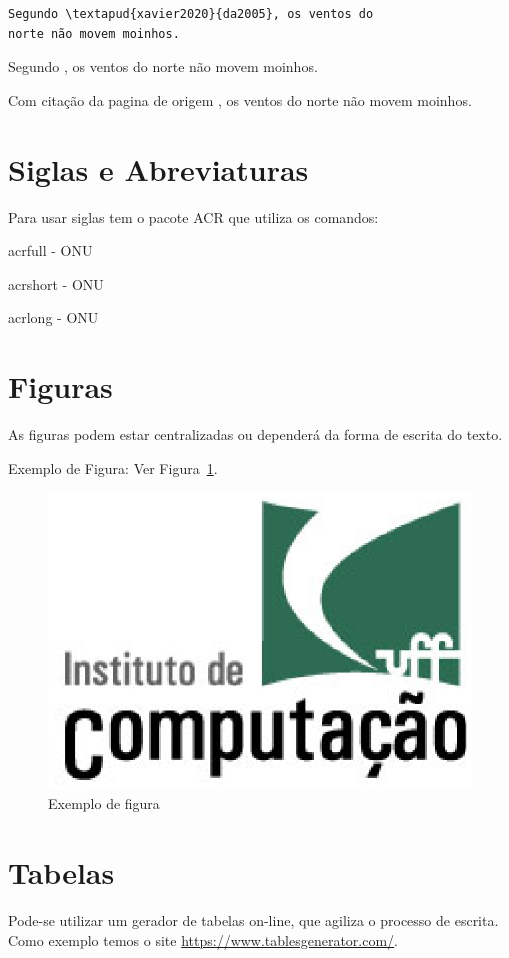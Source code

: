  \begin{verbatim}
Segundo \textapud{xavier2020}{da2005}, os ventos do
norte não movem moinhos.
\end{verbatim}

            Segundo , os ventos do norte não movem moinhos.
            
            Com citação da pagina de origem  , os ventos do norte não movem moinhos.



\section{Siglas e Abreviaturas}
\label{sec:siglas}

Para usar siglas tem o pacote \acrfull{ACR} que utiliza os comandos:

acrfull - \acrfull{ONU} 

acrshort - \acrshort{ONU}

acrlong -  \acrlong{ONU}



\section{Figuras}

As figuras podem estar centralizadas ou dependerá da forma de escrita do texto. 

Exemplo de Figura: Ver Figura~\ref{fig:exefig}.

\begin{figure}[!ht]
   \centering
   \includegraphics[width=0.3\linewidth]{capitulos/figuras/exefig.eps}
   \caption{Exemplo de figura}
   \label{fig:exefig}
\end{figure}



\section{Tabelas}

Pode-se utilizar um gerador de tabelas on-line, que agiliza o processo de escrita. Como exemplo temos o site \url{https://www.tablesgenerator.com/}. 


